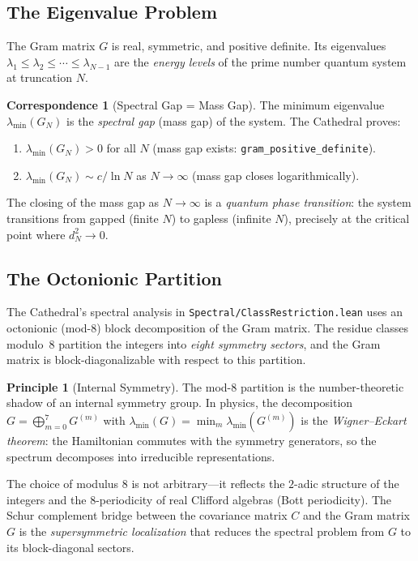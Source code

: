 \documentclass[11pt,a4paper]{article}
\theoremstyle{definition}
\newtheorem{principle}[definition]{Principle}
\newtheorem{correspondence}[definition]{Correspondence}
\newcommand{\lean}[1]{\texttt{#1}}
\begin{document}
\subsection{The Eigenvalue Problem}

The Gram matrix $G$ is real, symmetric, and positive definite. Its
eigenvalues $\lambda_1 \leq \lambda_2 \leq \cdots \leq \lambda_{N-1}$
are the \emph{energy levels} of the prime number quantum system at
truncation $N$.

\begin{correspondence}[Spectral Gap = Mass Gap]
The minimum eigenvalue $\lambda_{\min}(G_N)$ is the \emph{spectral gap}
(mass gap) of the system. The Cathedral proves:
\begin{enumerate}
  \item $\lambda_{\min}(G_N) > 0$ for all $N$ (mass gap exists:
    \lean{gram\_positive\_definite}).
  \item $\lambda_{\min}(G_N) \sim c/\ln N$ as $N \to \infty$
    (mass gap closes logarithmically).
\end{enumerate}
The closing of the mass gap as $N \to \infty$ is a \emph{quantum
phase transition}: the system transitions from gapped (finite $N$)
to gapless (infinite $N$), precisely at the critical point where
$d_N^2 \to 0$.
\end{correspondence}

\subsection{The Octonionic Partition}

The Cathedral's spectral analysis in \lean{Spectral/ClassRestriction.lean}
uses an octonionic (mod-8) block decomposition of the Gram matrix.
The residue classes modulo~8 partition the integers into \emph{eight
symmetry sectors}, and the Gram matrix is block-diagonalizable with
respect to this partition.

\begin{principle}[Internal Symmetry]
The mod-8 partition is the number-theoretic shadow of an internal
symmetry group. In physics, the decomposition $G = \bigoplus_{m=0}^7 G^{(m)}$
with $\lambda_{\min}(G) = \min_m \lambda_{\min}(G^{(m)})$ is the
\emph{Wigner--Eckart theorem}: the Hamiltonian commutes with the
symmetry generators, so the spectrum decomposes into irreducible
representations.

The choice of modulus $8$ is not arbitrary---it reflects the $2$-adic
structure of the integers and the $8$-periodicity of real Clifford
algebras (Bott periodicity). The Schur complement bridge between the
covariance matrix $C$ and the Gram matrix $G$ is the
\emph{supersymmetric localization} that reduces the spectral problem
from $G$ to its block-diagonal sectors.
\end{principle}
\end{document}
